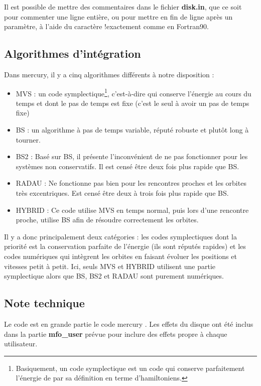 \begin{remarque}
Il est possible de mettre des commentaires dans le fichier \textbf{disk.in}, que ce soit pour commenter une ligne entière, ou pour mettre en fin de ligne après un paramètre, à l'aide du caractère \og !\fg exactement comme en Fortran90.
\end{remarque}

\subsection{Algorithmes d'intégration}
Dans mercury, il y a cinq algorithmes différents à notre disposition :
\begin{itemize}
\item MVS \citep{wisdom1991symplectic} : un code symplectique\footnote{Basiquement, un code symplectique est un code qui conserve parfaitement l'énergie de par sa définition en terme d'hamiltoniens.}, c'est-à-dire qui conserve l'énergie au cours du temps et dont le pas de temps est fixe (c'est le seul à avoir un pas de temps fixe)
\item BS \citep{stoer1980introduction} : un algorithme à pas de temps variable, réputé robuste et plutôt long à tourner.
\item BS2 \citep{press1992numerical} : Basé sur BS, il présente l'inconvénient de ne pas fonctionner pour les systèmes non conservatifs. Il est censé être deux fois plus rapide que BS.
\item RADAU \citep{everhart1985efficient} : Ne fonctionne pas bien pour les rencontres proches et les orbites très excentriques. Est censé être deux à trois fois plus rapide que BS.
\item HYBRID \citep{chambers1999hybrid} : Ce code utilise MVS en temps normal, puis lors d'une rencontre proche, utilise BS afin de résoudre correctement les orbites.
\end{itemize}

Il y a donc principalement deux catégories : les codes symplectiques dont la priorité est la conservation parfaite de l'énergie (ils sont réputés rapides) et les codes numériques qui intègrent les orbites en faisant évoluer les positions et vitesses petit à petit. Ici, seuls MVS et HYBRID utilisent une partie symplectique alors que BS, BS2 et RADAU sont purement numériques.

\subsection{Note technique}
Le code est en grande partie le code mercury \cite{chambers1999hybrid}. Les effets du disque ont été inclus dans la partie \textbf{mfo\_user} prévue pour inclure des effets propre à chaque utilisateur. 

